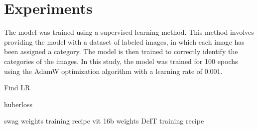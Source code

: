 \section{Experiments}
\label{sec:experiments}

The model was trained using a supervised learning method. This method involves providing the model with a dataset of labeled images, in which each image has been assigned a category. The model is then trained to correctly identify the categories of the images. In this study, the model was trained for 100 epochs using the AdamW optimization algorithm with a learning rate of 0.001.

Find LR \cite{smith2017cyclical}

huberloss \cite{huber1964robust}


swag weights training recipe \cite{singh2022revisiting}
vit 16b weights DeIT training recipe \cite{touvron2021training}